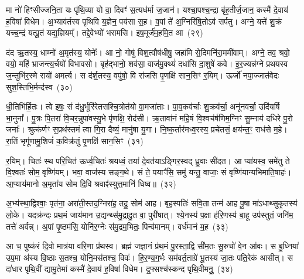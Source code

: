 {\anuvakamend[{रपः॑ पत॒त्रिणी॒र्या अꣳह॑सो॒ याः खना॑मि वो॒\-ऽष्टाद॑श च}]}%

मा नो॑ हिꣳसीज्जनि॒ता यः पृ॑थि॒व्या यो वा॒ दिवꣳ॑ स॒त्यध॑र्मा ज॒जान॑। यश्चा॒पश्च॒न्द्रा बृ॑ह॒तीर्ज॒जान॒ कस्मै॑ दे॒वाय॑ ह॒विषा॑ विधेम। अ॒भ्याव॑र्तस्व पृथिवि य॒ज्ञेन॒ पय॑सा स॒ह। व॒पां ते॑ अ॒ग्निरि॑षि॒तो\-ऽव॑ सर्पतु। अग्ने॒ यत्ते॑ शु॒क्रं यच्च॒न्द्रं यत्पू॒तं यद्य॒ज्ञियम्᳚। तद्दे॒वेभ्यो॑ भरामसि। इष॒मूर्ज॑म॒हमि॒त आ~(२९)

द॑द ऋ॒तस्य॒ धाम्नो॑ अ॒मृत॑स्य॒ योनेः᳚। आ नो॒ गोषु॑ विश॒त्वौष॑धीषु॒ जहा॑मि से॒दिमनि॑रा॒ममी॑वाम्। अग्ने॒ तव॒ श्रवो॒ वयो॒ महि॑ भ्राजन्त्य॒र्चयो॑ विभावसो। बृह॑द्भानो॒ शव॑सा॒ वाज॑मु॒क्थ्यं॑ दधा॑सि दा॒शुषे॑ कवे। इ॒र॒ज्यन्न॑ग्ने प्रथयस्व ज॒न्तुभि॑र॒स्मे रायो॑ अमर्त्य। स द॑र्\mbox{}श॒तस्य॒ वपु॑षो॒ वि रा॑जसि पृ॒णक्षि॑ सान॒सिꣳ र॒यिम्। ऊर्जो॑ नपा॒ज्जात॑वेदः सुश॒स्तिभि॒र्मन्द॑स्व~(३०)

धी॒तिभि॑र्हि॒तः। त्वे इषः॒ सं द॑धु॒र्भूरि॑रेतसश्चि॒त्रोत॑यो वा॒मजा॑ताः। पा॒व॒कव॑र्चाः शु॒क्रव॑र्चा॒ अनू॑नवर्चा॒ उदि॑यर्\mbox{}षि भा॒नुना᳚। पु॒त्रः पि॒तरा॑ वि॒चर॒न्नुपा॑वस्यु॒भे पृ॑णक्षि॒ रोद॑सी। ऋ॒तावा॑नं महि॒षं वि॒श्वच॑र्\mbox{}षणिम॒ग्निꣳ सु॒म्नाय॑ दधिरे पु॒रो जनाः᳚। श्रुत्क॑र्णꣳ स॒प्रथ॑स्तमं त्वा गि॒रा दैव्यं॒ मानु॑षा यु॒गा। नि॒ष्क॒र्तार॑मध्व॒रस्य॒ प्रचे॑तसं॒ क्षय॑न्त॒ꣳ॒ राध॑से म॒हे। रा॒तिं भृगू॑णामु॒शिजं॑ क॒विक्र॑तुं पृ॒णक्षि॑ सान॒सिꣳ~(३१)

र॒यिम्। चितः॑ स्थ परि॒चित॑ ऊर्ध्व॒चितः॑ श्रयध्वं॒ तया॑ दे॒वत॑या\-ऽ\-ङ्गिर॒स्वद् ध्रु॒वाः सी॑दत। आ प्या॑यस्व॒ समे॑तु ते वि॒श्वतः॑ सोम॒ वृष्णि॑यम्। भवा॒ वाज॑स्य सङ्ग॒थे। सं ते॒ पयाꣳ॑सि॒ समु॑ यन्तु॒ वाजाः॒ सं वृष्णि॑यान्यभिमाति॒षाहः॑। आ॒प्याय॑मानो अ॒मृता॑य सोम दि॒वि श्रवाꣴ॑स्युत्त॒मानि॑ धिष्व॥~(३२)

{\anuvakamend[{आ मन्द॑स्व सान॒सिमेका॒न्नच॑त्वारि॒ꣳ॒शच्च॑}]}%

अ॒भ्य॑स्था॒द्विश्वाः॒ पृत॑ना॒ अरा॑ती॒स्तद॒ग्निरा॑ह॒ तदु॒ सोम॑ आह। बृह॒स्पतिः॑ सवि॒ता तन्म॑ आह पू॒षा मा॑\-ऽ\-धाथ्सुकृ॒तस्य॑ लो॒के। यदक्र॑न्दः प्रथ॒मं जाय॑मान उ॒द्यन्थ्स॑मु॒द्रादु॒त वा॒ पुरी॑षात्। श्ये॒नस्य॑ प॒क्षा ह॑रि॒णस्य॑ बा॒हू उप॑स्तुतं॒ जनि॑म॒ तत्ते॑ अर्वन्न्। अ॒पां पृ॒ष्ठम॑सि॒ योनि॑र॒ग्नेः स॑मु॒द्रम॒भितः॒ पिन्व॑मानम्। वर्ध॑मानं म॒ह~(३३)

आ च॒ पुष्क॑रं दि॒वो मात्र॑या वरि॒णा प्र॑थस्व। ब्रह्म॑ जज्ञा॒नं प्र॑थ॒मं पु॒रस्ता॒द्वि सी॑म॒तः सु॒रुचो॑ वे॒न आ॑वः। स बु॒ध्निया॑ उप॒मा अ॑स्य वि॒ष्ठाः स॒तश्च॒ योनि॒मस॑तश्च॒ विवः॑। हि॒र॒ण्य॒ग॒र्भः सम॑वर्त॒ताग्रे॑ भू॒तस्य॑ जा॒तः पति॒रेक॑ आसीत्। स दा॑धार पृथि॒वीं द्यामु॒तेमां कस्मै॑ दे॒वाय॑ ह॒विषा॑ विधेम। द्र॒फ्सश्च॑स्कन्द पृथि॒वीमनुु॒~(३४)

